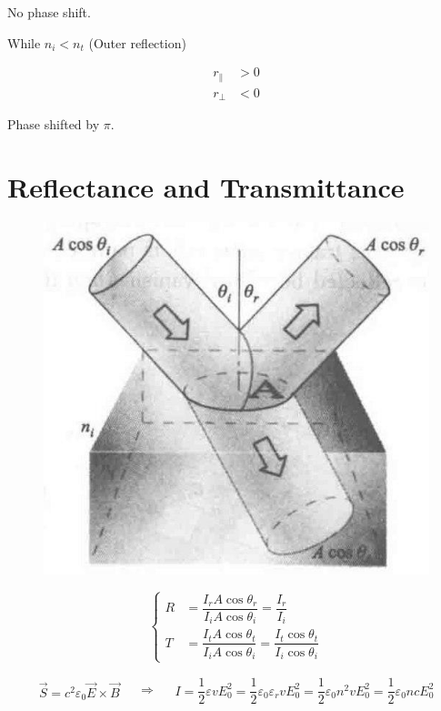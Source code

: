 No phase shift.

While $n_i < n_t$ (Outer reflection)

\begin{equation*}
  \begin{aligned}
    r_{\parallel} &> 0 \\
    r_{\perp} &< 0
  \end{aligned}
\end{equation*}

Phase shifted by $\pi$.

\section{Reflectance and Transmittance}

\begin{figure}[H]
  \centering
  \includegraphics[width=0.4\linewidth]{figures/Reflectance-and-Transmittance}
\end{figure}

\begin{equation*}
  \left\{
  \begin{aligned}
    R &= \dfrac{I_r A \cos \theta_r}{I_i A \cos \theta_i} = \dfrac{I_r}{I_i} \\
    T &= \dfrac{I_t A \cos \theta_t}{I_i A \cos \theta_i} = \dfrac{I_t \cos \theta_t}{I_i \cos \theta_i}
  \end{aligned}
  \right.
\end{equation*}

\begin{equation*}
  \begin{aligned}
    \vec{S} = c^2 \varepsilon_0 \vec{E} \times \vec{B}
  \end{aligned}
  \quad \Rightarrow \quad
  \begin{aligned}
    I = \dfrac{1}{2} \varepsilon v E_0^2 = \dfrac{1}{2} \varepsilon_0 \varepsilon_r v E_0^2 = \dfrac{1}{2} \varepsilon_0 n^2 v E_0^2 = \dfrac{1}{2} \varepsilon_0 n c E_0^2
  \end{aligned}
\end{equation*}


